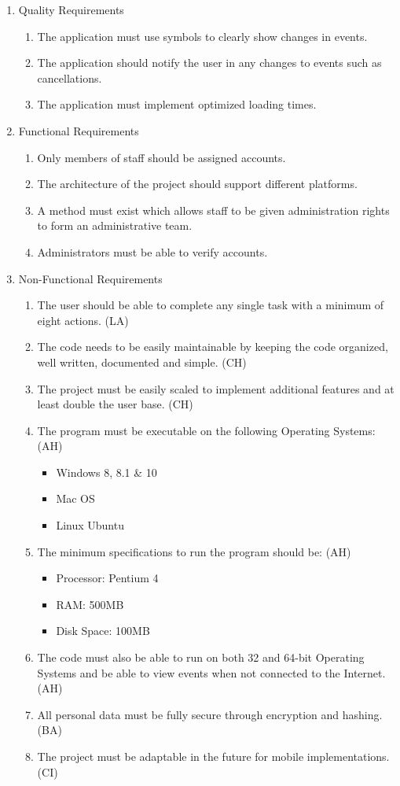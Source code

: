 \documentclass[a4paper]{article}
\begin{document}
\begin{enumerate}
  \item Quality Requirements
  \begin{enumerate}[label=Q\arabic*.]
    \item The application must use symbols to clearly show changes in events.
    \item The application should notify the user in any changes to events such as cancellations.
    \item The application must implement optimized loading times.
  \end{enumerate}
  \item Functional Requirements
  \begin{enumerate}[label=F\arabic*.]
    \item Only members of staff should be assigned accounts.
    \item The architecture of the project should support different platforms.
    \item A method must exist which allows staff to be given administration rights to form an administrative team.
    \item Administrators must be able to verify accounts.
  \end{enumerate}
  \item Non-Functional Requirements
  \begin{enumerate}[label=NF\arabic*.]
  	  \item The user should be able to complete any single task with a minimum of eight actions. (LA)
      \item The code needs to be easily maintainable by keeping the code organized, well written, documented and simple. (CH)
      \item The project must be easily scaled to implement additional features and at least double the user base. (CH)
      \item The program must be executable on the following Operating Systems: (AH) \begin{itemize}
        \item Windows 8, 8.1 \& 10
        \item Mac OS
        \item Linux Ubuntu
      \end{itemize}
      \item The minimum specifications to run the program should be: (AH) \begin{itemize}
        \item Processor: Pentium 4
        \item RAM: 500MB
        \item Disk Space: 100MB
      \end{itemize}
      \item The code must also be able to run on both 32 and 64-bit Operating Systems and be able to view events when not connected to the Internet. (AH)
      \item All personal data must be fully secure through encryption and hashing. (BA)
      \item The project must be adaptable in the future for mobile implementations. (CI)
  \end{enumerate}
\end{enumerate}
\end{document}
